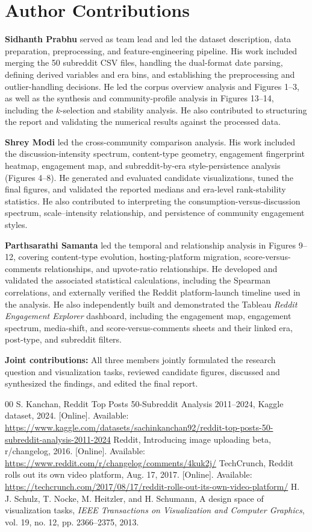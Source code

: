 \documentclass[conference]{IEEEtran}
\begin{document}
\section*{Author Contributions}
\textbf{Sidhanth Prabhu} served as team lead and led the dataset description, data preparation, preprocessing, and feature-engineering pipeline. His work included merging the 50 subreddit CSV files, handling the dual-format date parsing, defining derived variables and era bins, and establishing the preprocessing and outlier-handling decisions. He led the corpus overview analysis and Figures 1--3, as well as the synthesis and community-profile analysis in Figures 13--14, including the $k$-selection and stability analysis. He also contributed to structuring the report and validating the numerical results against the processed data.

\textbf{Shrey Modi} led the cross-community comparison analysis. His work included the discussion-intensity spectrum, content-type geometry, engagement fingerprint heatmap, engagement map, and subreddit-by-era style-persistence analysis (Figures 4--8). He generated and evaluated candidate visualizations, tuned the final figures, and validated the reported medians and era-level rank-stability statistics. He also contributed to interpreting the consumption-versus-discussion spectrum, scale--intensity relationship, and persistence of community engagement styles.

\textbf{Parthsarathi Samanta} led the temporal and relationship analysis in Figures 9--12, covering content-type evolution, hosting-platform migration, score-versus-comments relationships, and upvote-ratio relationships. He developed and validated the associated statistical calculations, including the Spearman correlations, and externally verified the Reddit platform-launch timeline used in the analysis. He also independently built and demonstrated the Tableau \emph{Reddit Engagement Explorer} dashboard, including the engagement map, engagement spectrum, media-shift, and score-versus-comments sheets and their linked era, post-type, and subreddit filters.

\textbf{Joint contributions:} All three members jointly formulated the research question and visualization tasks, reviewed candidate figures, discussed and synthesized the findings, and edited the final report.

\begin{thebibliography}{00}
 S. Kanchan, Reddit Top Posts 50-Subreddit Analysis 2011--2024, Kaggle dataset, 2024. [Online]. Available: \url{https://www.kaggle.com/datasets/sachinkanchan92/reddit-top-posts-50-subreddit-analysis-2011-2024}
 Reddit, Introducing image uploading beta, r/changelog, 2016. [Online]. Available: \url{https://www.reddit.com/r/changelog/comments/4kuk2j/}
 TechCrunch, Reddit rolls out its own video platform, Aug. 17, 2017. [Online]. Available: \url{https://techcrunch.com/2017/08/17/reddit-rolls-out-its-own-video-platform/}
 H. J. Schulz, T. Nocke, M. Heitzler, and H. Schumann, A design space of visualization tasks, \emph{IEEE Transactions on Visualization and Computer Graphics}, vol. 19, no. 12, pp. 2366--2375, 2013.
\end{thebibliography}
\end{document}
